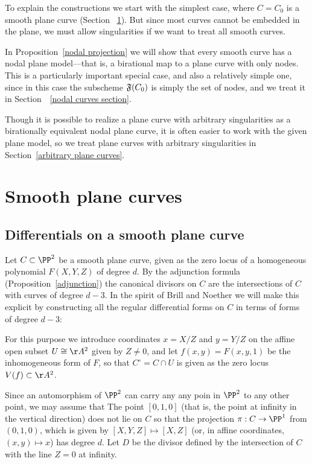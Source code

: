 To explain the constructions  we start with the simplest case, where $C = C_0$ is a smooth plane curve (Section~ \ref{smooth plane curves}). But since most curves cannot be embedded in the plane, we must
allow singularities if we want to treat all smooth curves. 

In Proposition~\ref{nodal projection}  we will show that every smooth curve has a nodal plane model---that is,
a birational map to a plane curve with only nodes. This is a particularly
important special case, and also a relatively simple one, since in this case the subscheme $\adj(C_{0})$
is simply the set of nodes,
and we treat it in Section~~\ref{nodal curves section}. 

Though it is possible to realize a plane curve with arbitrary singularities as a birationally
equivalent nodal plane curve, it is often easier to work with the given plane model, so we treat
plane curves with arbitrary singularities in Section~\ref{arbitrary plane curves}. 

\section{Smooth plane curves}\label{smooth plane curves}

\subsection{Differentials on a smooth plane curve}\label{canonical series on smooth plane curves}

Let $C \subset \PP^2$  be a smooth plane curve, given as the zero locus of a homogeneous polynomial $F(X,Y,Z)$ of degree $d$. By the adjunction formula (Proposition~\ref{adjunction}) the canonical  divisors on $C$
are the intersections of $C$ with curves of degree $d-3$. In the spirit of Brill and Noether we
will make this explicit by constructing all
 the regular differential forms on $C$ in terms of forms of degree $d-3$:


For this purpose we introduce coordinates $x = X/Z$ and $y = Y/Z$ on the affine open subset $U \cong \AA^2$ given by $Z \neq 0$, and let $f(x,y) = F(x, y,1)$ be the inhomogeneous form of $F$, so that $C^\circ = C \cap U$ is given as the zero locus $V(f) \subset  \AA^2$. 

Since an automorphism of $\PP^2$ can carry any  any poin in $\PP^{2}$ to any other point, we may assume
that 
 The point $[0,1,0]$ (that is, the point at infinity in the vertical direction) does not lie on $C$ so that the
 projection  $\pi: C \to \PP^1$ from $(0,1,0)$, which is given by $[X,Y,Z] \mapsto [X,Z]$ (or, in affine coordinates, $(x,y) \mapsto x$)  has degree $d$. Let $D$ be the divisor defined by the intersection of $C$ with the line $Z=0$ at infinity.

